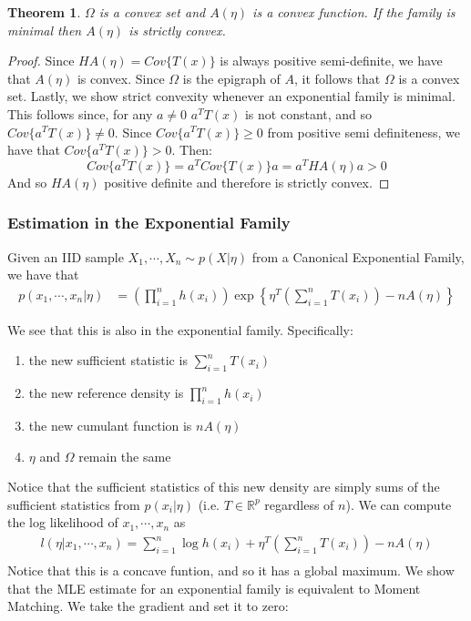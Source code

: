 \documentclass[]{article}
\theoremstyle{mattstyle}
\newtheorem{theorem}{Theorem}[section]
\theoremstyle{definition}
\begin{document}
\begin{theorem}
	$\Omega$ is a convex set and $A(\eta)$ is a convex function. If the family is minimal then $A(\eta)$ is strictly convex.
\end{theorem}
\begin{proof}
	Since $HA(\eta)=Cov\{T(x)\}$ is always positive semi-definite, we have that $A(\eta)$ is convex. Since $\Omega$ is the epigraph of $A$, it follows that $\Omega$ is a convex set. Lastly, we show strict convexity whenever an exponential family is minimal. This follows since, for any $a\ne0$ $a^TT(x)$ is not constant, and so $Cov\{a^TT(x)\}\ne0$. Since $Cov\{a^TT(x)\}\ge 0$ from positive semi definiteness, we have that $Cov\{a^TT(x)\}>0$.
	Then:
	$$Cov\{a^TT(x)\}=a^TCov\{T(x)\}a=a^THA(\eta)a>0$$
	And so $HA(\eta)$ positive definite and therefore is strictly convex.
\end{proof}

\subsubsection{Estimation in the Exponential Family}

Given an IID sample $X_1, \cdots, X_n \sim p(X|\eta)$ from a Canonical Exponential Family, we have that
\begin{align*}
p(x_1, \cdots, x_n|\eta) &= \left(\prod_{i=1}^n h(x_i)\right) \exp\left\{ \eta^T\left(\sum_{i=1}^nT(x_i)\right) - nA(\eta)\right\}
\end{align*}

We see that this is also in the exponential family. Specifically:
\begin{enumerate}
	\item the new sufficient statistic is $\sum_{i=1}^nT(x_i)$
	\item the new reference density is $\prod_{i=1}^n h(x_i)$
	\item the new cumulant function is $nA(\eta)$
	\item $\eta$ and $\Omega$ remain the same
\end{enumerate}

Notice that the sufficient statistics of this new density are simply sums of the sufficient statistics from $p(x_i|\eta)$ (i.e. $T \in \mathbb{R}^p$ regardless of $n$). We can compute the log likelihood of $x_1, \cdots, x_n$ as
\begin{align*}
l(\eta| x_1, \cdots, x_n) = \sum_{i=1}^n \log h(x_i) +  \eta^T\left(\sum_{i=1}^nT(x_i)\right) - nA(\eta)\\
\end{align*}
Notice that this is a concave funtion, and so it has a global maximum. We show that the MLE estimate for an exponential family is equivalent to Moment Matching. We take the gradient and set it to zero:
\end{document}
